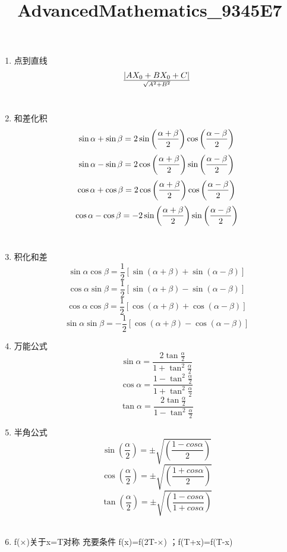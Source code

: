 \documentclass[11pt]{article}
\title{AdvancedMathematics\_9345E7}
\begin{document}
    
    
    \maketitle
    
    

    
    \begin{enumerate}
\def\labelenumi{\arabic{enumi}.}
\item
  点到直线 \[ {\left |{AX_0+BX_0+C} \right |} \over \sqrt{A^2+B^2} \]\\
\item
  和差化积\\
  \[ \sin \alpha + \sin \beta = 2 \sin { \left ( {\alpha + \beta } \over 2 \right ) } \cos \left ( {\alpha - \beta } \over 2 \right ) \]
  \[\sin \alpha - \sin \beta = 2 \cos { \left ( {\alpha + \beta } \over 2 \right ) } \sin \left ( {\alpha - \beta } \over 2 \right ) \]
  \[ \cos \alpha + \cos \beta = 2 \cos { \left ( {\alpha + \beta } \over 2 \right ) } \cos \left ( {\alpha - \beta } \over 2 \right )\]
  \[ \cos \alpha - \cos \beta = -2 \sin { \left ( {\alpha + \beta } \over 2 \right ) } \sin \left ( {\alpha - \beta } \over 2 \right )\]\\
\item
  积化和差\\
  \[ \sin \alpha \cos \beta = \frac{1}{2} \left [ \sin(\alpha+\beta)+\sin(\alpha-\beta) \right ]\]
  \[ \cos \alpha \sin \beta = \frac{1}{2} \left [ \sin(\alpha+\beta)-\sin(\alpha-\beta) \right ]\]
  \[ \cos \alpha \cos \beta = \frac{1}{2} \left [ \cos(\alpha+\beta)+\cos(\alpha-\beta) \right ]\]
  \[ \sin \alpha \sin \beta =- \frac{1}{2} \left [ \cos(\alpha+\beta)-\cos(\alpha-\beta) \right ]\]
\item
  万能公式\\
  \[ \sin\alpha=\frac{2\tan \frac{\alpha}{2}}{1+\tan^2 \frac{\alpha}{2}}\]
  \[ \cos \alpha =\frac {1-\tan^2\frac{\alpha}{2}}{1+\tan^2\frac{\alpha}{2}}\]
  \[ \tan\alpha=\frac{2\tan \frac{\alpha}{2}}{1-\tan^2 \frac{\alpha}{2}}\]
\item
  半角公式\\
  \[ \sin \left(\frac{\alpha}{2} \right)=\pm \sqrt{\left(\frac{1-cos \alpha}{2}\right)}\]
  \[ \cos \left(\frac{\alpha}{2} \right)=\pm \sqrt{\left(\frac{1+cos \alpha}{2}\right)}\]
  \[ \tan \left(\frac{\alpha}{2} \right)=\pm \sqrt{\left(\frac{1-cos \alpha}{1+cos \alpha}\right)}\]\\
\item
  f(×)关于x=T对称 充要条件 f(x)=f(2T-×) ；f(T+x)=f(T-x)

\end{enumerate}
\end{document}

